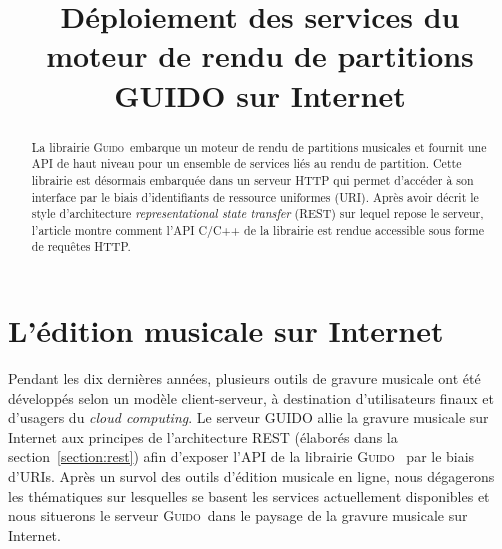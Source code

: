 \documentclass{article}
\title{Déploiement des services du moteur de rendu de partitions GUIDO sur Internet}
\date{}
\newcommand{\guido}		{\textsc{Guido}}
\begin{document}
\maketitle

\begin{abstract}

La librairie \guido\ embarque un moteur de rendu de partitions musicales et fournit une API de haut niveau pour un ensemble de services liés au rendu de partition. Cette librairie est désormais embarquée dans un serveur HTTP qui permet d'accéder à son interface par le biais d'identifiants de ressource uniformes (URI). Après avoir décrit le style d'architecture \emph{representational state transfer} (REST) sur lequel repose le serveur, l'article montre comment l'API C/C++ de la librairie est rendue accessible sous forme de requêtes HTTP.

\end{abstract}


\section{L'édition musicale sur Internet}\label{section:online-musical-editing}
Pendant les dix dernières années, plusieurs outils de gravure musicale ont été développés selon un modèle client-serveur, à destination d'utilisateurs finaux et d'usagers du \emph{cloud computing}. Le serveur GUIDO allie la gravure musicale sur Internet aux principes de l'architecture REST (élaborés dans la section~\ref{section:rest}) afin d'exposer l'API de la librairie \guido\ \cite{guido} \cite{daudin09a} par le biais d'URIs. Après un survol des outils d'édition musicale en ligne, nous dégagerons les thématiques sur lesquelles se basent les services actuellement disponibles et nous situerons le serveur \guido\ dans le paysage de la gravure musicale sur Internet.
\end{document}
